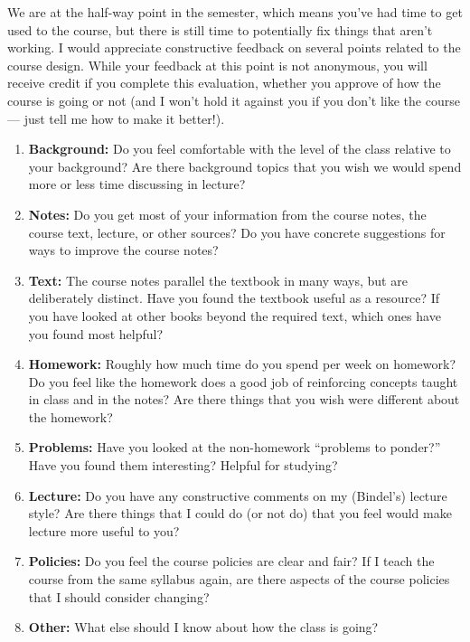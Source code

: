 \documentclass[12pt, leqno]{article}
\begin{document}

We are at the half-way point in the semester, which means you've had
time to get used to the course, but there is still time to potentially
fix things that aren't working.  I would appreciate constructive
feedback on several points related to the course design.  While your
feedback at this point is not anonymous, you will receive credit if
you complete this evaluation, whether you approve of how the course is
going or not (and I won't hold it against you if you don't like the
course --- just tell me how to make it better!).

\begin{enumerate}
\item {\bf Background:} Do you feel comfortable with the level of the
  class relative to your background?  Are there background topics that
  you wish we would spend more or less time discussing in lecture?
\item {\bf Notes:} Do you get most of your information from the course
  notes, the course text, lecture, or other sources?  Do you have
  concrete suggestions for ways to improve the course notes?
\item {\bf Text:} The course notes parallel the textbook in many ways, but are
  deliberately distinct.  Have you found the textbook useful as a
  resource?  If you have looked at other books beyond the required
  text, which ones have you found most helpful?
\item {\bf Homework:} Roughly how much time do you spend per week on homework?
  Do you feel like the homework does a good job of reinforcing
  concepts taught in class and in the notes?  Are there things that
  you wish were different about the homework?
\item {\bf Problems:} Have you looked at the non-homework ``problems
  to ponder?''  Have you found them interesting?  Helpful for
  studying?
\item {\bf Lecture:} Do you have any constructive comments on my
  (Bindel's) lecture style?  Are there things that I could do (or not
  do) that you feel would make lecture more useful to you?
\item {\bf Policies:} Do you feel the course policies are clear and
  fair?  If I teach the course from the same syllabus again, are there
  aspects of the course policies that I should consider changing?
\item {\bf Other:} What else should I know about how the class is
  going?
\end{enumerate}
\end{document}
